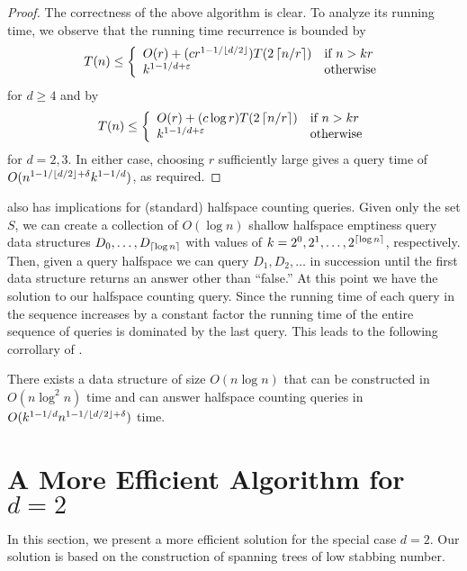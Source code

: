 \documentclass[lotsofwhite]{patmorin}
\newcommand{\eps}{\varepsilon}
\newcommand{\X}{1-1/\floor{d/2}+\delta}
\begin{document}
\begin{proof}
The correctness of the above algorithm is clear. To analyze its
running time, we observe that the running time recurrence is bounded
by
\[
   T(n) \le \left\{ \begin{array}{ll}
     O(r) + (cr^{1-1/\floor{d/2}})T(2\ceil{n/r}) & \mbox{if $n > kr$} \\
     k^{1-1/d+\eps} & \mbox{otherwise} 
   \end{array}\right.
\]
for $d\ge 4$ and by
\[
   T(n) \le \left\{ \begin{array}{ll}
     O(r) + (c\log r)T(2\ceil{n/r}) & \mbox{if $n > kr$} \\
     k^{1-1/d+\eps} & \mbox{otherwise} 
   \end{array}\right.
\]
for $d=2,3$.  
In either case, choosing $r$ sufficiently large gives a query time of
$O(n^{\X}k^{1-1/d})$, as required.
\end{proof}

 also has implications for (standard) halfspace counting
queries. Given only the set $S$, we can create a collection of $O(\log
n)$ shallow halfspace emptiness query data structures
$D_0,\ldots,D_{\left\lceil \log n \right\rceil}$ with values of
$k=2^0,2^1,\ldots,2^{\left\lceil \log n \right\rceil}$, respectively.  Then, given a
query halfspace we can query $D_1,D_2,\ldots$ in succession until the
first data structure returns an answer other than ``false.''  At this
point we have the solution to our halfspace counting query.  Since the
running time of each query in the sequence increases by a constant
factor the running time of the entire sequence of queries is dominated
by the last query. This leads to the following corrollary of
.

\begin{cor}
There exists a data structure of size $O(n\log n)$ that can be
constructed in $O(n\log^2 n)$ time and can answer
halfspace counting queries in $O(k^{1-1/d}n^{\X})$ time.
\end{cor}

\section{A More Efficient Algorithm for $d=2$}

In this section, we present a more efficient solution for the special
case $d=2$.  Our solution is based on the construction of spanning
trees of low stabbing number.
\end{document}
